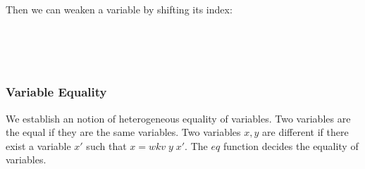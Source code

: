 Then we can weaken a variable by shifting its index:

\begin{code}%
\>[0]\AgdaSpace{}%
\AgdaSymbol{:}\AgdaSpace{}%
\AgdaSymbol{(}\AgdaSpace{}%
\AgdaSymbol{:}\AgdaSpace{}%
\AgdaSpace{}%
\AgdaSpace{}%
\AgdaSymbol{)}\AgdaSpace{}%
\AgdaSpace{}%
\AgdaSpace{}%
\AgdaSymbol{(}\AgdaSpace{}%
\AgdaOperator{\AgdaFunction{-}}\AgdaSpace{}%
\AgdaSymbol{)}\AgdaSpace{}%
\AgdaSpace{}%
\AgdaSpace{}%
\AgdaSpace{}%
\AgdaSpace{}%
\<%
\\
\>[0]\AgdaSpace{}%
\AgdaSpace{}%
\AgdaSpace{}%
\AgdaSymbol{=}\AgdaSpace{}%
\AgdaSpace{}%
\<%
\\
\>[0]\AgdaSpace{}%
\AgdaSymbol{(}\AgdaSpace{}%
\AgdaSymbol{)}\AgdaSpace{}%
\AgdaSpace{}%
\AgdaSymbol{=}\AgdaSpace{}%
\<%
\\
\>[0]\AgdaSpace{}%
\AgdaSymbol{(}\AgdaSpace{}%
\AgdaSymbol{)}\AgdaSpace{}%
\AgdaSymbol{(}\AgdaSpace{}%
\AgdaSymbol{)}\AgdaSpace{}%
\AgdaSymbol{=}\AgdaSpace{}%
\AgdaSpace{}%
\AgdaSymbol{(}\AgdaSpace{}%
\AgdaSpace{}%
\AgdaSymbol{)}\<%
\end{code}

\subsubsection*{Variable Equality}

We establish an notion of heterogeneous equality of variables. Two variables are the equal if they are the same variables. Two variables $x, y$ are different if there exist a variable $x'$ such that $x = wkv\;y\;x'$. The $eq$ function decides the equality of variables.

